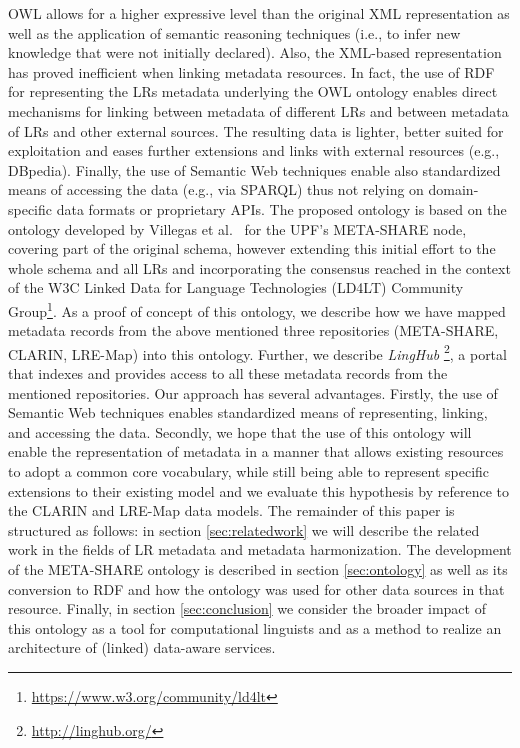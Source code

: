 \documentclass{llncs}
\begin{document}
OWL allows for a higher expressive level than the original XML representation as well as the application of semantic reasoning techniques (i.e., to infer new knowledge that were not initially declared). Also, the XML-based representation has proved inefficient when linking metadata resources. In fact, the use of RDF for representing the LRs metadata underlying the OWL ontology enables direct mechanisms for linking between metadata of different LRs and between metadata of LRs and other external sources.
The resulting data is lighter, better suited for exploitation and eases further extensions and links with external resources (e.g., DBpedia).
Finally, the use of Semantic Web techniques enable also standardized means of accessing the data (e.g., via SPARQL) thus not relying on domain-specific data formats or proprietary APIs.
The proposed ontology is based on the ontology developed by Villegas et al.~\cite{Villegas2014} for the UPF's META-SHARE node, covering part of the original schema, however extending this initial effort to the whole schema and all LRs and incorporating the consensus
reached in the context of the W3C Linked Data for Language Technologies (LD4LT) Community Group\footnote{\url{https://www.w3.org/community/ld4lt}}.
As a proof of concept of this ontology, we describe how we have mapped metadata records from the above mentioned three repositories (META-SHARE, CLARIN, LRE-Map) into this ontology.
Further, we describe \emph{LingHub} \footnote{\url{http://linghub.org/}}, a portal that indexes and provides access to all these metadata records from the mentioned repositories.
Our approach has several advantages. Firstly, the use of Semantic Web techniques enables standardized means of representing, linking, and accessing the data.
Secondly, we hope that the use of this ontology will enable the representation of metadata in a manner that allows existing resources to adopt a
common core vocabulary, while still being able to represent specific extensions
to their existing model and we evaluate this hypothesis by reference to the
CLARIN and LRE-Map data models.
The remainder of this paper is structured as follows: in section
\ref{sec:relatedwork} we will describe the related work in the fields of
LR metadata and metadata harmonization. The development of the
META-SHARE ontology is described in section \ref{sec:ontology}
as well as its conversion to RDF and how the ontology was used for other data sources in that
resource. Finally, in section \ref{sec:conclusion} we consider the broader
impact of this ontology as a tool for computational linguists and as a method to
realize an architecture of (linked) data-aware services.
\end{document}

